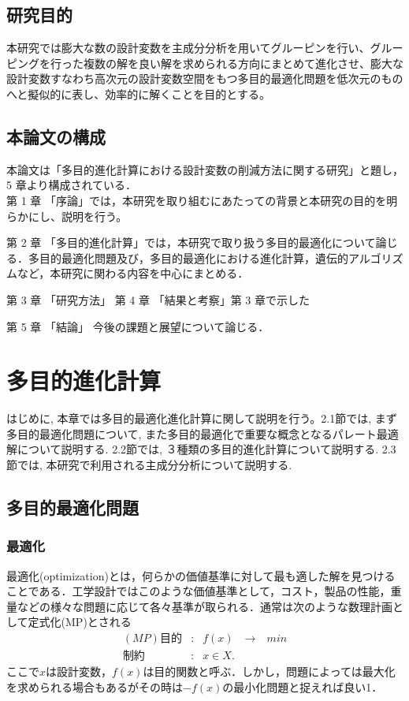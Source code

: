\documentclass[11pt,a4j,notitlepage]{jreport}
\begin{document}
\section{研究目的}
本研究では膨大な数の設計変数を主成分分析を用いてグルーピンを行い、グルーピングを行った複数の解を良い解を求められる方向にまとめて進化させ、膨大な設計変数すなわち高次元の設計変数空間をもつ多目的最適化問題を低次元のものへと擬似的に表し、効率的に解くことを目的とする。
\section{本論文の構成}
本論文は「多目的進化計算における設計変数の削減方法に関する研究」と題し，
5 章より構成されている．
\\
第 1 章
「序論」では，本研究を取り組むにあたっての背景と本研究の目的を明らかにし、説明を行う。

第 2 章
「多目的進化計算」では，本研究で取り扱う多目的最適化について論じる．多目的最適化問題及び，多目的最適化における進化計算，遺伝的アルゴリズムなど，本研究に関わる内容を中心にまとめる．

第 3 章
「研究方法」
第 4 章
「結果と考察」第 3 章で示した

第 5 章
「結論」
今後の課題と展望について論じる．
\chapter{多目的進化計算}
はじめに, 本章では多目的最適化進化計算に関して説明を行う。2.1節では, まず多目的最適化問題について, また多目的最適化で重要な概念となるパレート最適解について説明する.
2.2節では, ３種類の多目的進化計算について説明する.
2.3節では, 本研究で利用される主成分分析について説明する.
\section{多目的最適化問題}
\subsection{最適化}
最適化(optimization)とは，何らかの価値基準に対して最も適した解を見つけることである．工学設計ではこのような価値基準として，コスト，製品の性能，重量などの様々な問題に応じて各々基準が取られる．通常は次のような数理計画として定式化(MP)とされる
\begin{eqnarray}
(MP)         \mbox{目的}&:& f(x)\mbox{　→　}min\\
         \mbox{制約}&:&x    \in  X.
\end{eqnarray}
ここで$x$は設計変数，$f(x)$は目的関数と呼ぶ．しかし，問題によっては最大化を求められる場合もあるがその時は$-f(x)$の最小化問題と捉えれば良い1．
\end{document}
